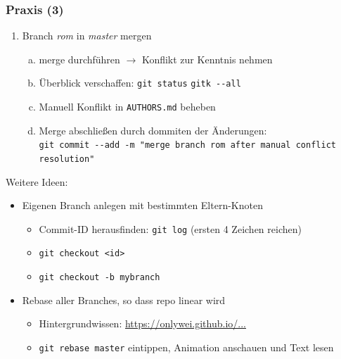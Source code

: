 \documentclass{beamer}
\begin{document}
\begin{frame}[fragile,label=uebung40]
\frametitle{Praxis (3)}
\begin{enumerate}
 \setcounter{enumi}{\value{taskcounter}}
 \item Branch \textit{rom} in \textit{master} mergen
 \begin{enumerate}[a)]
 \item merge durchführen $\rightarrow$ Konflikt zur Kenntnis nehmen
 \item Überblick verschaffen: \verb|git status|  \verb|gitk --all|
 \item Manuell Konflikt in \verb|AUTHORS.md| beheben
 \item Merge abschließen durch dommiten der Änderungen:\\
 {\tiny \verb|git commit --add -m "merge branch rom after manual conflict resolution"|}
 \end{enumerate}

 \setcounter{taskcounter}{\value{enumi}}
\end{enumerate}

Weitere Ideen:
\begin{itemize}
 \item Eigenen Branch anlegen mit bestimmten Eltern-Knoten
 \begin{itemize}
  \item Commit-ID herausfinden: \verb|git log| (ersten 4 Zeichen reichen)
  \item \verb|git checkout <id>|
  \item \verb|git checkout -b mybranch|
 \end{itemize}
 \item Rebase aller Branches, so dass repo linear wird
 \begin{itemize}
  \item Hintergrundwissen: \href{https://onlywei.github.io/explain-git-with-d3/#rebase}{https://onlywei.github.io/...}
  \item \verb|git rebase master| eintippen, Animation anschauen und Text lesen
 \end{itemize}


\end{itemize}

\end{frame}
\end{document}
